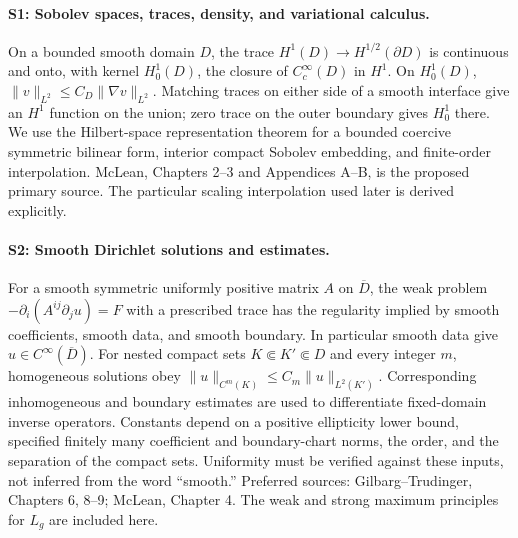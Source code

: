 \documentclass[11pt]{article}
\theoremstyle{definition}
\theoremstyle{remark}
\numberwithin{equation}{section}
\begin{document}
\paragraph{S1: Sobolev spaces, traces, density, and variational calculus.}
On a bounded smooth domain $D$, the trace $H^1(D)\to H^{1/2}(\partial D)$
is continuous and onto, with kernel $H^1_0(D)$, the closure of
$C_c^\infty(D)$ in $H^1$. On $H^1_0(D)$,
$\|v\|_{L^2}\leq C_D\|\nabla v\|_{L^2}$. Matching traces on either
side of a smooth interface give an $H^1$ function on the union; zero
trace on the outer boundary gives $H^1_0$ there. We use the Hilbert-space
representation theorem for a bounded coercive symmetric bilinear form,
interior compact Sobolev embedding, and finite-order interpolation.
McLean, Chapters 2--3 and Appendices A--B, is the proposed primary source.
The particular scaling interpolation used later is derived explicitly.

\paragraph{S2: Smooth Dirichlet solutions and estimates.}
For a smooth symmetric uniformly positive matrix $A$ on $\overline D$,
the weak problem $-\partial_i(A^{ij}\partial_j u)=F$ with a prescribed
trace has the regularity implied by smooth coefficients, smooth data,
and smooth boundary. In particular smooth data give $u\in C^\infty(\overline D)$.
For nested compact sets $K\Subset K'\Subset D$ and every integer $m$,
homogeneous solutions obey $\|u\|_{C^m(K)}\leq C_m\|u\|_{L^2(K')}$.
Corresponding inhomogeneous and boundary estimates are used to differentiate
fixed-domain inverse operators. Constants depend on a positive ellipticity
lower bound, specified finitely many coefficient and boundary-chart norms,
the order, and the separation of the compact sets. Uniformity must be
verified against these inputs, not inferred from the word ``smooth.''
Preferred sources: Gilbarg--Trudinger, Chapters 6, 8--9; McLean, Chapter 4.
The weak and strong maximum principles for $L_g$ are included here.
\end{document}
